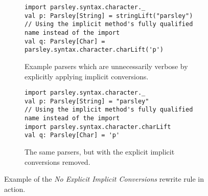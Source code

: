 \documentclass[../../main.tex]{subfiles}
\begin{document}
\begin{figure}[htb]
\begin{subfigure}{\textwidth}
\begin{verbatim}
import parsley.syntax.character._
val p: Parsley[String] = stringLift("parsley")
// Using the implicit method's fully qualified name instead of the import
val q: Parsley[Char] = parsley.syntax.character.charLift('p')
\end{verbatim}
\caption{Example parsers which are unnecessarily verbose by explicitly applying implicit conversions.}
\label{fig:explicit-implicits-example}
\end{subfigure}
%
\begin{subfigure}{\textwidth}
\vspace{3ex}
\begin{verbatim}
import parsley.syntax.character._
val p: Parsley[String] = "parsley"
// Using the implicit method's fully qualified name instead of the import
import parsley.syntax.character.charLift
val q: Parsley[Char] = 'p'
\end{verbatim}
\caption{The same parsers, but with the explicit implicit conversions removed.}
\label{fig:explicit-implicits-rewrite}
\end{subfigure}
\caption{Example of the \emph{No Explicit Implicit Conversions} rewrite rule in action.}
\end{figure}
\end{document}
